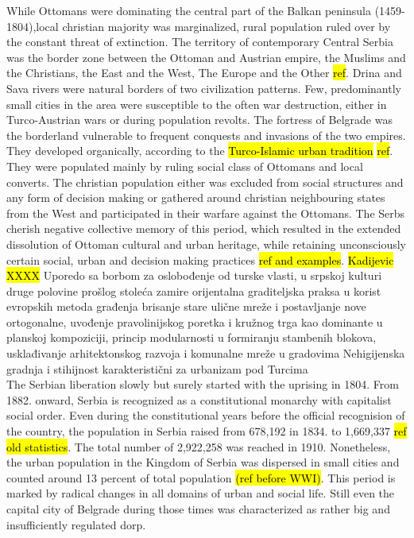 \documentclass[11pt]{report}
\begin{document}
While Ottomans were dominating the central part of the Balkan peninsula (1459-1804),\footnotemark local christian majority was marginalized, rural population ruled over by the constant threat of extinction. The territory of contemporary Central Serbia was the border zone between the Ottoman and Austrian empire, the Muslims and the Christians, the East and the West, The Europe and the Other \hl{ref}. Drina and Sava rivers were natural borders of two civilization patterns. Few, predominantly small cities in the area were susceptible to the often war destruction, either in Turco-Austrian wars or during population revolts. The fortress of Belgrade was the borderland vulnerable to frequent conquests and invasions of the two empires.  They developed organically, according to the \hl{Turco-Islamic urban tradition} \hl{ref}. They were populated mainly by ruling social class of Ottomans and local converts. The christian population either was excluded from social structures and any form of decision making or gathered around christian neighbouring states from the West and participated in their warfare against the Ottomans. The Serbs cherish negative collective memory of this period, which resulted in the extended dissolution of Ottoman cultural and urban heritage, while retaining unconsciously certain social, urban and decision making practices \hl{ref and examples}.    
	\hl{Kadijevic XXXX}
Uporedo sa borbom za oslobođenje od turske vlasti, u srpskoj
kulturi  druge  polovine  prošlog  stoleća  zamire  orijentalna  gra­diteljska  praksa  u  korist  evropskih  metoda građenja
brisanje  stare  ulič­ne  mreže  i  postavljanje  nove  ortogonalne,  uvođenje
pravolinijskog poretka i kružnog trga kao dominante u planskoj kompoziciji, princip modularnosti u formiranju stambenih  blokova,  usklađivanje  arhitektonskog  razvoja  i  komunalne  mreže  u  grado­vima 
Nehigijenska gradnja i stihijnost karakteristični za urbanizam pod Turcima 
\\
The Serbian liberation slowly but surely started with the uprising in 1804. From 1882. onward, Serbia is recognized as a constitutional monarchy with capitalist social order. Even during the constitutional years before the official recognision of the country, the population in Serbia raised from 678,192 in 1834. to 1,669,337 \hl{ref old statistics}. The total number of 2,922,258 was reached in 1910. Nonetheless, the urban population in the Kingdom of Serbia was dispersed in small cities and counted around 13 percent of total population \hl{(ref before WWI)}. This period is marked by radical changes in all domains of urban and social life. Still even the capital city of Belgrade during those times was characterized as rather big and insufficiently regulated dorp.
\end{document}
